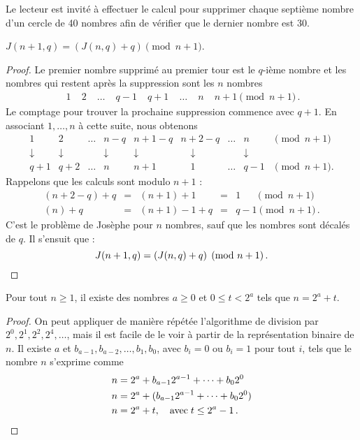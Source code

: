 Le lecteur est invité à effectuer le calcul pour supprimer chaque septième nombre d'un cercle de 40 nombres afin de vérifier que le dernier nombre est 30.

\begin{theorem}\label{thm.jo1}
$J(n+1,q)=(J(n,q)+q) \pmod {n+1}$.
\end{theorem}

\begin{proof}
Le premier nombre supprimé au premier tour est le $q$-ième nombre et les nombres qui restent après la suppression sont les $n$ nombres 
\[
\begin{array}{rrrrrrrr}
\;1&\;2&\;\ldots&\;q-1&\;q+1&\;\ldots&\;n&\;n+1 \pmod {n+1}\,.
\end{array}
\]
Le comptage pour trouver la prochaine suppression commence avec $q+1$. En associant $1,\ldots,n$ à cette suite, nous obtenons 
\[
\begin{array}{ccccccccc}
1& 2&\ldots& n-q& n+1-q& n+2-q&\ldots& n& \!\!\!\!\!\!\!\!\!\!\!\!\!\!\pmod {n\!+\!1}\\
\downarrow& \downarrow&&\downarrow& \downarrow&\quad \downarrow&& \downarrow\\
q+1& q+2&\ldots&n& n+1&\quad 1&\ldots& q-1& \!\!\!\!\!\!\!\!\!\pmod {n\!+\!1}.
\end{array}
\]
Rappelons que les calculs sont modulo $n+1$ :
\[
\begin{array}{lclcl}
(n+2-q)+q&=& (n+1)+1&=& 1 \quad\;\;\pmod {n+1}\\
(n)+q&= &(n+1)-1+q&= &q-1\pmod {n+1}\,.
\end{array}
\]
C'est le problème de Josèphe pour $n$ nombres, sauf que les nombres sont décalés de $q$. Il s'ensuit que :
\[
J(n+1,q)=(J(n,q)+q) \pmod {n+1}\,.
\qedhere\]
\end{proof}

\begin{theorem}\label{lem.jo}
Pour tout $n\geq 1$, il existe des nombres $a\geq 0$ et $0\leq t < 2^a$  tels que $n=2^a+t$.
\end{theorem}
\begin{proof}
On peut appliquer de manière répétée 
 l'algorithme de division par $2^0, 2^1, 2^2, 2^4,\ldots$, mais il est facile de le voir à partir de la représentation binaire de $n$. Il existe  $a$ et $b_{a-1},b_{a-2},\ldots,b_{1},b_{0}$, avec  $b_i=0$ ou $b_i=1$  pour tout $i$, tels que le nombre $n$ s'exprime comme 
\begin{align*}
n&=2^a+b_{a-1}2^{a-1}+\cdots+b_{0}2^{0}\\
n&=2^a+(b_{a-1}2^{a-1}+\cdots+b_{0}2^{0})\\
n&=2^a+t,\quad \textrm{avec}\; t\leq 2^a-1\,.\qedhere
\end{align*}
\end{proof}


